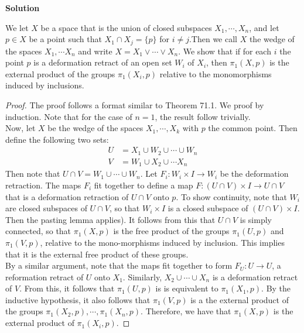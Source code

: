 \documentclass[12pt]{article}
\newcounter{AnswerCounter}
\newcounter{SubAnswerCounter}
\newenvironment{answer}[0]{
  \setcounter{SubAnswerCounter}{1}
  \bigskip
  \textbf{Solution \arabic{AnswerCounter}}
  \\
  \begin{small}
}{
  \end{small}
  \stepcounter{AnswerCounter}
}
\begin{document}
\begin{answer}[Page 438, \#2]
We let $X$ be a space that is the union of closed subspaces $X_1, \cdots, X_n$, and let $p \in X$ be a point such that $X_1 \cap X_j = \{p\}$ for $i \neq j$.Then we call $X$ the wedge of the spaces $X_1, \cdots X_n$ and write $X = X_1 \lor \cdots \lor X_n$. We show that if for each $i$ the point $p$ is a deformation retract of an open set $W_i$ of $X_i$, then $\pi_1(X,p)$ is the external product of the groups $\pi_1(X_i,p)$ relative to the monomorphisms induced by inclusions.
\begin{proof}
The proof follows a format similar to Theorem 71.1. We proof by induction. Note that for the case of $n= 1$, the result follow trivially. \\

Now, let $X$ be the wedge of the spaces $X_1, \cdots, X_k$ with $p$ the common point. Then define the following two sets:
\begin{align*}
U &= X_1 \cup W_2 \cup \cdots \cup W_n \\
V &= W_1 \cup X_2 \cup \cdots X_n
\end{align*}
Then note that $U \cap V = W_1 \cup \cdots \cup W_n$. Let $F_i: W_i \times I \to W_i$ be the deformation retraction. The maps $F_i$ fit together to define a map $F: (U \cap V) \times I \to U \cap V$ that is a deformation retraction of $U \cap V$ onto $p$. To show continuity, note that $W_i$ are closed subspaces of $U \cap V$, so that $W_i \times I$ is a closed subspace of $(U \cap V) \times I$. Then the pasting lemma applies). It follows from this that $U \cap V$ is simply connected, so that $\pi_1(X,p)$ is the free product of the groups $\pi_1(U,p)$ and $\pi_1(V,p)$, relative to the mono-morphisms induced by inclusion. This implies that it is the external free product of these groups. \\

By a similar argument, note that the maps fit together to form $F_U: U \to U$, a reformation retract of $U$ onto $X_1$. Similarly, $X_2 \cup \cdots \cup X_n$ is a deformation retract of $V$. From this, it follows that $\pi_1(U,p)$ is is equivalent to $\pi_1(X_1,p)$. By the inductive hypothesis, it also follows that $\pi_1(V,p)$ is a the external product of the groups $\pi_1(X_2,p),\cdots, \pi_1(X_n,p)$. Therefore, we have that $\pi_1(X,p)$ is the external product of $\pi_1(X_i,p)$.
\end{proof}
\end{answer}
\end{document}
